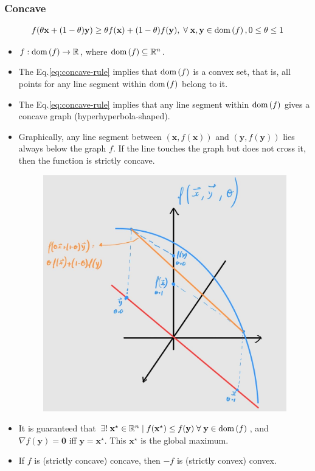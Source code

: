 \documentclass{article}
\newcommand{\dom}[1]{\ensuremath{\textnormal{dom}\left(#1\right)}} %
\begin{document}
\subsubsection{Concave}
\begin{align}
    f(\theta\mathbf{x}+(1-\theta)\mathbf{y}) \geq \theta f(\mathbf{x}) + (1-\theta)f(\mathbf{y}),\;\forall\; \mathbf{x}, \mathbf{y} \in \dom{f}, 0\leq\theta\leq 1
    \label{eq:concave-rule}
\end{align}
\begin{itemize}
    \item \(f: \dom{f} \rightarrow \mathbb{R}\), where \(\dom{f} \subseteq \mathbb{R}^{n}\).
    \item The Eq.\eqref{eq:concave-rule} implies that \(\dom{f}\) is a convex set, that is, all points for any line segment within \(\dom{f}\) belong to it.
    \item The Eq.\eqref{eq:concave-rule} implies that any line segment within \(\dom{f}\) gives a concave graph (hyperhyperbola-shaped).
    \item Graphically, any line segment between \((\mathbf{x}, f(\mathbf{x}))\) and \((\mathbf{y}, f(\mathbf{y}))\) lies always below the graph \(f\). If the line touches the graph but does not cross it, then the function is strictly concave.
    \begin{figure}[H]
        \centering
        \includegraphics[scale=.2]{figs/concave.png}
    \end{figure}
    \item It is guaranteed that \(\exists!\; \mathbf{x}^{\star} \in \mathbb{R}^{n} \mid f(\mathbf{x}^{\star}) \leq f(\mathbf{y})\;\forall\;\mathbf{y}\in\dom{f}\), and \(\nabla f(\mathbf{y}) = \mathbf{0}\) iff \(\mathbf{y} = \mathbf{x}^{\star}\). This \(\mathbf{x}^{\star}\) is the global maximum. 
    \item If \(f\) is (strictly concave) concave, then \(-f\) is (strictly convex) convex.
\end{itemize}
\end{document}
